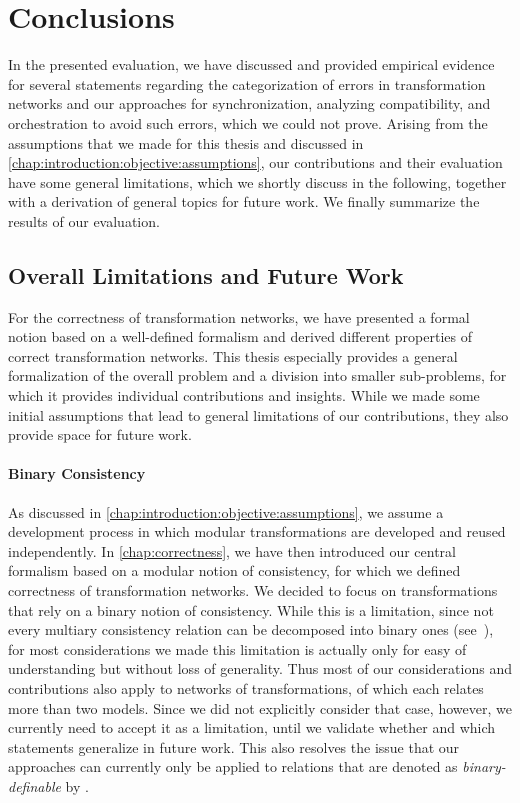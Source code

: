 \section{Conclusions}

In the presented evaluation, we have discussed and provided empirical evidence for several statements regarding the categorization of errors in transformation networks and our approaches for synchronization, analyzing compatibility, and orchestration to avoid such errors, which we could not prove.
Arising from the assumptions that we made for this thesis and discussed in \autoref{chap:introduction:objective:assumptions}, our contributions and their evaluation have some general limitations, which we shortly discuss in the following, together with a derivation of general topics for future work.
We finally summarize the results of our evaluation.


\subsection{Overall Limitations and Future Work}

For the correctness of transformation networks, we have presented a formal notion based on a well-defined formalism and derived different properties of correct transformation networks.
This thesis especially provides a general formalization of the overall problem and a division into smaller sub-problems, for which it provides individual contributions and insights.
While we made some initial assumptions that lead to general limitations of our contributions, they also provide space for future work.

\paragraph{Binary Consistency}
As discussed in \autoref{chap:introduction:objective:assumptions}, we assume a development process in which modular transformations are developed and reused independently.
In \autoref{chap:correctness}, we have then introduced our central formalism based on a modular notion of consistency, for which we defined correctness of transformation networks.
We decided to focus on transformations that rely on a binary notion of consistency.
While this is a limitation, since not every multiary consistency relation can be decomposed into binary ones (see~\cite{stevens2020BidirectionalTransformationLarge-SoSym}), for most considerations we made this limitation is actually only for easy of understanding but without loss of generality.
Thus most of our considerations and contributions also apply to networks of transformations, of which each relates more than two models.
Since we did not explicitly consider that case, however, we currently need to accept it as a limitation, until we validate whether and which statements generalize in future work.
This also resolves the issue that our approaches can currently only be applied to relations that are denoted as \emph{binary-definable} by \textcite{stevens2020BidirectionalTransformationLarge-SoSym}.

